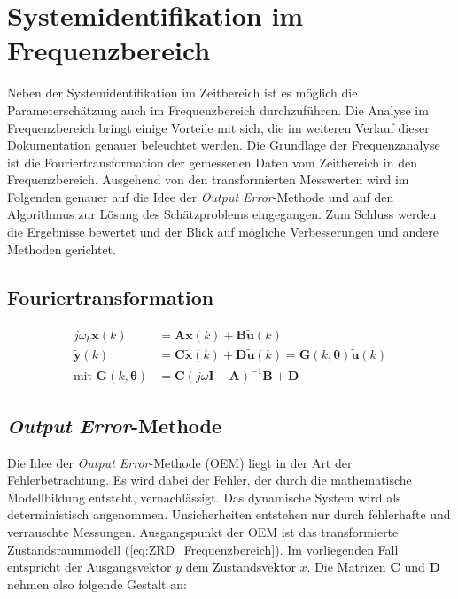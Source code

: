 \chapter{Systemidentifikation im Frequenzbereich}

Neben der Systemidentifikation im Zeitbereich ist es möglich die Parameterschätzung auch im Frequenzbereich durchzuführen. 
Die Analyse im Frequenzbereich bringt einige Vorteile mit sich, die im weiteren Verlauf dieser Dokumentation genauer 
beleuchtet werden. Die Grundlage der Frequenzanalyse ist die Fouriertransformation der gemessenen Daten vom Zeitbereich in 
den Frequenzbereich. Ausgehend von den transformierten Messwerten wird im Folgenden genauer auf die Idee der 
\textit{Output Error}-Methode und auf den Algorithmus zur Lösung des Schätzproblems eingegangen. Zum Schluss werden die 
Ergebnisse 
bewertet und der Blick auf mögliche Verbesserungen und andere Methoden gerichtet.


\section{Fouriertransformation}  

\begin{align}
	j\omega_{k}\mathbf{\tilde{x}}(k)  &= \mathbf{A\tilde{x}}(k) + \mathbf{B\tilde{u}}(k) \nonumber \\
 	\mathbf{\tilde{y}}(k)             &= \mathbf{C\tilde{x}}(k) + \mathbf{D\tilde{u}}(k) = \mathbf{G}(k,\mathbf{\theta})\mathbf{\tilde{u}}(k) \nonumber \\
 	\text{mit }\mathbf{G}(k,\mathbf{\theta}) &= \mathbf{C}(j\omega\mathbf{I}-\mathbf{A})^{-1}\mathbf{B}+\mathbf{D}
	\label{eq:ZRD_Frequenzbereich}
\end{align}



\section{\textit{Output Error}-Methode}

Die Idee der \textit{Output Error}-Methode (OEM) liegt in der Art der Fehlerbetrachtung. Es wird dabei der Fehler, der durch 
die 
mathematische Modellbildung entsteht, vernachlässigt. Das dynamische System wird als deterministisch angenommen. 
Unsicherheiten entstehen nur durch fehlerhafte und verrauschte Messungen. Ausgangspunkt der OEM ist das transformierte 
Zustandsraummodell (\ref{eq:ZRD_Frequenzbereich}). Im vorliegenden Fall entspricht der Ausgangsvektor $\tilde{y}$ dem 
Zustandsvektor $\tilde{x}$. Die Matrizen $\mathbf{C}$ und $\mathbf{D}$ nehmen also folgende Gestalt an:

